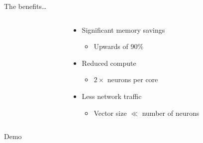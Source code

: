 \documentclass[t]{beamer}
\begin{document}
\begin{frame}{The benefits\ldots}
  \begin{columns}[c]
    \begin{column}{.35\textwidth}%
      
    \end{column}\hfill
    \begin{column}{.62\textwidth}
      \begin{itemize}
        \item Significant memory savings
        \begin{itemize}
          \item<2-> Upwards of 90\%
        \end{itemize}
        \item Reduced compute
        \begin{itemize}
          \item<3-> $2\times$ neurons per core
        \end{itemize}
        \item Less network traffic
        \begin{itemize}
          \item<4-> Vector size $\ll$ number of neurons
        \end{itemize}
      \end{itemize}
    \end{column}
  \end{columns}
\end{frame}

\begin{darkframes}
  \begin{frame}{\hspace{1em}}
    \centering
    \vfill
    {\huge Demo}
    \vfill
  \end{frame}

\end{darkframes}
  
\end{document}
